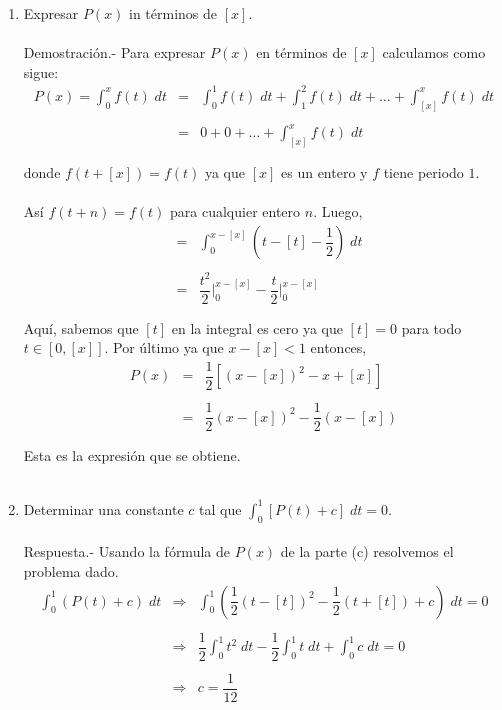 \begin{enumerate}[\bfseries  1.]
\begin{enumerate}[\bfseries (a)]
	    \item Expresar $P(x)$ in términos de $[x]$.\\\\
		Demostración.-\; Para expresar $P(x)$ en términos de $[x]$ calculamos como sigue:
		$$\begin{array}{rcl}
		    P(x)=\displaystyle\int_0^x f(t)\; dt&=&\displaystyle\int_0^1 f(t)\; dt + \int_1^2 f(t)\; dt + \ldots + \int_{[x]}^x f(t)\; dt\\\\
							&=&0+0+\ldots + \int_{[x]}^x f(t)\; dt\\\\
		\end{array}$$
		donde $f(t+[x])=f(t)$ ya que $[x]$ es un entero y $f$ tiene periodo $1$.\\\\
		Así $f(t+n)=f(t)$ para cualquier entero $n$. Luego,
		$$\begin{array}{rcl}
		    &=&\displaystyle\int_0^{x-[x]} \left(t-[t]-\dfrac{1}{2}\right)\; dt\\\\
		    &=&\dfrac{t^2}{2}\bigg|_0^{x-[x]}-\dfrac{t}{2}\bigg|_0^{x-[x]}\\\\
		\end{array}$$
		Aquí, sabemos que $[t]$ en la integral es cero ya que $[t]=0$ para todo $t\in [0,[x]]$. Por último ya que $x-[x]<1$ entonces,
		$$\begin{array}{rcl}
		    P(x)&=&\dfrac{1}{2}\left[(x-[x])^2-x+[x]\right]\\\\
			&=&\dfrac{1}{2}(x-[x])^2-\dfrac{1}{2}(x-[x])\\\\
		\end{array}$$
		Esta es la expresión que se obtiene.\\\\


	    \item Determinar una constante $c$ tal que $\int_0^1\left[P(t)+c\right]\; dt = 0$.\\\\
		Respuesta.-\; Usando la fórmula de $P(x)$ de la parte (c) resolvemos el problema dado.
		$$\begin{array}{rcl}
		    \displaystyle\int_0^1 (P(t)+c)\; dt&\Longrightarrow&\displaystyle\int_0^1 \left(\dfrac{1}{2}(t-[t])^2-\dfrac{1}{2}(t+[t])+c\right)\; dt =0\\\\
					  &\Longrightarrow&\dfrac{1}{2}\displaystyle\int_0^1 t^2\; dt - \dfrac{1}{2}\int_0^1 t\; dt + \int_0^1 c\; dt = 0\\\\
					  &\Longrightarrow&c=\dfrac{1}{12}\\\\
		\end{array}$$


\end{enumerate}
\end{enumerate}
